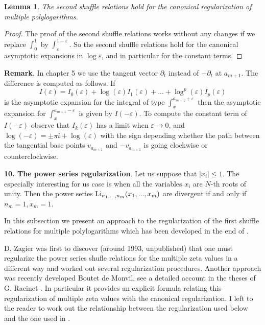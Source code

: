\documentclass[10pt]{article}
\newtheorem{lemma}[theorem]{Lemma}
\begin{document}
\begin{lemma} \label{inlem}
The second shuffle relations hold for the canonical regularization of multiple polylogarithms. 
\end{lemma}

\begin{proof} The proof of the second shuffle relations works without any changes if we replace $\int_0^1$ by $\int_{\varepsilon}^{1-\varepsilon}$.   So the second shuffle relations hold for the canonical 
asymptotic expansions in $\log \varepsilon$, and in particular for the constant terms. 


\end{proof}

{\bf Remark}. In chapter 5 we  use the tangent vector $\partial_t$ 
instead of $-\partial_t$ at $a_{m+1}$.  
The difference is computed as follows.
If $$
I(\varepsilon)= I_0(\varepsilon)  + \log(\varepsilon)I_1(\varepsilon) + ... 
+ \log^p(\varepsilon)I_p(\varepsilon)
$$
 is the asymptotic expansion for the 
integral of type $\int_{x}^{a_{m+1} + \varepsilon }$ then 
the asymptotic expansion for $\int_{x}^{a_{m+1} - \varepsilon }$ 
is given  by $I(-\varepsilon)$. To compute the constant term of $I(-\varepsilon)$ 
observe that $I_k(\varepsilon)$ has a limit when $\varepsilon \to 0$, and 
 $\log (-\varepsilon ) = \pm \pi i +
\log (\varepsilon ) $ with the sign depending whether the path between the tangential 
base points  $v_{a_{m+1}}$ and $-v_{a_{m+1}}$ is going clockwise or counterclockwise.

{\bf 10. The power series regularization}.  Let us suppose that $|x_i| \leq 1$. 
The especially interesting for us case is when all the variables 
$x_i$ are $N$-th roots of unity. Then    
the power series ${\rm Li}_{n_1,...,n_m}(x_1,...,x_m)$ are divergent if and only if 
$n_m=1, x_m=1$.  
  
 In this subsection we present an approach to the   regularization 
of the first shuffle relations for multiple polylogarithms which has been 
developed in the  end of \cite{G3}. 

D. Zagier was  first to discover (around 1993, unpublished) 
that one must regularize 
the power series shufle relations for the multiple zeta values 
in a different way 
and worked out several regularization procedures. 
Another approach was recently  developed Boutet de Monvil, see a detailed 
account in 
the theses of G. Racinet \cite{R}. In particular it 
provides an explicit formula relating this regularization of multiple zeta values with 
the canonical regularization. 
I left to the reader to work out 
the relationship between the regularization used below and the one used 
in \cite{R}. 
\end{document}
